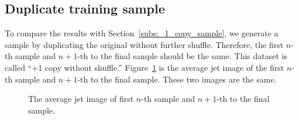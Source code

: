 \documentclass[12pt]{article}
\begin{document}
    \subsection{Duplicate training sample}%
    \label{sub:duplicate_training_sample}
        To compare the results with Section~\ref{subs:_1_copy_sample}, we generate a sample by duplicating the original without further shuffle. Therefore, the first $n$-th sample and $n+1$-th to the final sample should be the same. This dataset is called ``+1 copy without shuffle.'' Figure~\ref{fig:average_jet_image_0_to_n_n_to_2n} is the average jet image of the first $n$-th sample and $n+1$-th to the final sample. These two images are the same.
        \begin{figure}[htpb]
            \centering
            \caption{The average jet image of first $n$-th sample and $n+1$-th to the final sample.}
            \label{fig:average_jet_image_0_to_n_n_to_2n}
        \end{figure}
\end{document}
